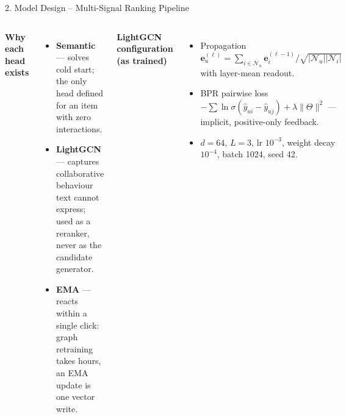 \documentclass[aspectratio=169, 11pt]{beamer}
\begin{document}
\begin{frame}{2. Model Design -- Multi-Signal Ranking Pipeline}
\begin{center}
\end{center}
\vspace{-2mm}
\begin{columns}[T]
{\scriptsize \textbf{Why each head exists}}
\begin{itemize}\tiny
  \item \textbf{Semantic} --- solves cold start; the only head defined for an item with zero interactions.
  \item \textbf{LightGCN} --- captures collaborative behaviour text cannot express; used as a reranker, never as the candidate generator.
  \item \textbf{EMA} --- reacts within a single click: graph retraining takes hours, an EMA update is one vector write.
\end{itemize}
{\scriptsize \textbf{LightGCN configuration (as trained)}}
\begin{itemize}\tiny
  \item Propagation $\mathbf{e}^{(\ell)}_u=\sum_{i\in\mathcal{N}_u}\mathbf{e}^{(\ell-1)}_i/\sqrt{|\mathcal{N}_u||\mathcal{N}_i|}$ with layer-mean readout.
  \item BPR pairwise loss $-\sum\ln\sigma(\hat y_{ui}-\hat y_{uj})+\lambda\lVert\Theta\rVert^2$ --- implicit, positive-only feedback.
  \item $d{=}64$, $L{=}3$, lr $10^{-3}$, weight decay $10^{-4}$, batch 1024, seed 42.
\end{itemize}
\end{columns}
\end{frame}
\end{document}
